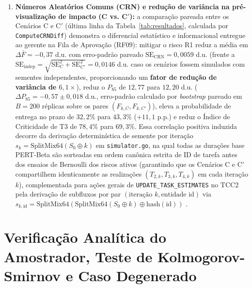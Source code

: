\documentclass[12pt,openany,oneside,a4paper,english,brazilian,sumario=tradicional]{abntex2}
\begin{document}
\begin{enumerate}
  \item \textbf{Números Aleatórios Comuns (CRN) e redução de variância na pré-visualização de impacto (C vs. C$'$):} a comparação pareada entre os Cenários C e C$'$ (última linha da Tabela~\ref{tab:resultados}, calculada por \texttt{ComputeCRNDiff}) demonstra o diferencial estatístico e informacional entregue ao gerente na Fila de Aprovação (RF09): mitigar o risco R1 reduz a média em $\Delta\bar{F} = -0{,}37$ d.u. com erro-padrão pareado $\mathrm{SE}_{\mathrm{CRN}} = 0{,}0059$ d.u. (frente a $\mathrm{SE}_{\mathrm{indep}} = \sqrt{\mathrm{SE}_C^2 + \mathrm{SE}_{C'}^2} = 0{,}0146$ d.u. caso os cenários fossem simulados com sementes independentes, proporcionando um \textbf{fator de redução de variância de $6{,}1\times$}), reduz o $P_{85}$ de $12{,}77$ para $12{,}20$ d.u. ($\Delta P_{85} = -0{,}57 \pm 0{,}018$ d.u., erro-padrão calculado por \textit{bootstrap} pareado em $B=200$ réplicas sobre os pares $(F_{k,C}, F_{k,C'})$), eleva a probabilidade de entrega no prazo de $32{,}2\%$ para $43{,}3\%$ ($+11{,}1$ p.p.) e reduz o Índice de Criticidade de T3 de $78{,}4\%$ para $69{,}3\%$. Essa correlação positiva induzida decorre da derivação determinística de semente por iteração $s_k = \mathrm{SplitMix64}(S_0 \oplus k)$ em \texttt{simulator.go}, na qual todas as durações base PERT-Beta são sorteadas em ordem canônica estrita de ID de tarefa antes dos ensaios de Bernoulli dos riscos ativos (garantindo que os Cenários C e C$'$ compartilhem identicamente as realizações $(T_{2,k}, T_{3,k}, T_{4,k})$ em cada iteração $k$), complementada para ações gerais de \texttt{UPDATE\_TASK\_ESTIMATES} no TCC2 pela derivação de subfluxos por par $(\text{iteração } k, \text{entidade id})$ via $s_{k,\mathrm{id}} = \mathrm{SplitMix64}(\mathrm{SplitMix64}(S_0 \oplus k) \oplus \mathrm{hash}(\mathrm{id}))$ \cite{steele2014,lecuyer2017}.
\end{enumerate}

\section{Verificação Analítica do Amostrador, Teste de Kolmogorov-Smirnov e Caso Degenerado}\label{sec:ks_test}
\end{document}
